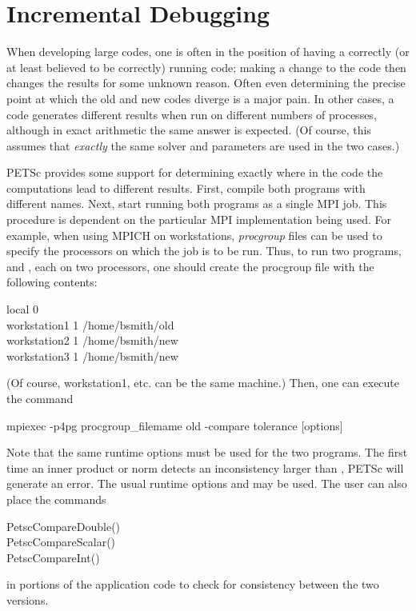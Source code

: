{{{\section{Incremental Debugging} 

When developing large codes, one is often in the position of having a
correctly (or at least believed to be correctly) running code; making
a change to the code then changes the results for some unknown reason.
Often even determining the precise point at which the old and new
codes diverge is a major pain.  In other cases, a code generates
different results when run on different numbers of processes,
although in exact arithmetic the same answer is expected. (Of course,
this assumes that {\em exactly} the same solver and parameters are
used in the two cases.)
 
PETSc provides some support for determining exactly where in the code
the computations lead to different results. First, compile both programs
with different names.  Next, start running
both programs as a single MPI job. This procedure is dependent on the particular
MPI implementation being used.
For example, when using MPICH on workstations, 
{\em procgroup} files can be used to specify the processors on which the job is
to be run.  Thus, to run two programs,  and ,
each on two processors, one should create the procgroup file with the
following contents:
\begin{tabbing}
   local 0\\
   workstation1 1 /home/bsmith/old\\
   workstation2 1 /home/bsmith/new\\
   workstation3 1 /home/bsmith/new\\
\end{tabbing}
(Of course, workstation1, etc. can be the same machine.) Then, one can
execute the command
\begin{tabbing}
   mpiexec -p4pg \trl{<}procgroup\_filemame\trl{>} old -compare \trl{<}tolerance\trl{>} [options]
\end{tabbing}
Note that the same runtime options must be used for the two programs.
The first time an inner product or norm detects an inconsistency larger
than , PETSc will generate an error. The usual runtime
options  and  may 
be used.   The user can also place the commands 
\begin{tabbing}
   PetscCompareDouble()\\
   PetscCompareScalar()\\
   PetscCompareInt()
\end{tabbing}
in portions of the application code to check for consistency between
the two versions.
 
}}}
